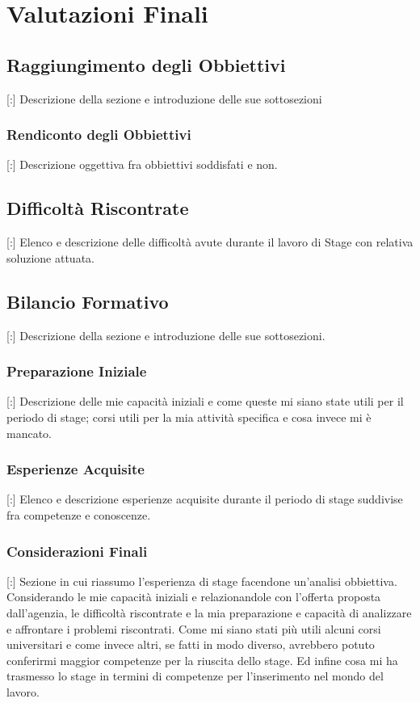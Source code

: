
\chapter{Valutazioni Finali}
\label{4.0}
\thispagestyle{fancy} 

\section{Raggiungimento degli Obbiettivi}

[:] Descrizione della sezione e introduzione delle sue sottosezioni

\subsection{Rendiconto degli Obbiettivi}

[:] Descrizione oggettiva fra obbiettivi soddisfati e non.


\section{Difficoltà Riscontrate}

[:] Elenco e descrizione delle difficoltà avute durante il lavoro di Stage con relativa soluzione attuata.

\section{Bilancio Formativo}

[:] Descrizione della sezione e introduzione delle sue sottosezioni.

\subsection{Preparazione Iniziale}

[:] Descrizione delle mie capacità iniziali e come queste mi siano state utili per il periodo di stage; corsi utili per la mia attività specifica e cosa invece mi è mancato.

\subsection{Esperienze Acquisite}

[:] Elenco e descrizione esperienze acquisite durante il periodo di stage suddivise fra competenze e conoscenze.

\subsection{Considerazioni Finali}

[:] Sezione in cui riassumo l'esperienza di stage facendone un'analisi obbiettiva. Considerando le mie capacità iniziali e relazionandole con l'offerta proposta dall'agenzia, le difficoltà riscontrate e la mia preparazione e capacità di analizzare e affrontare i problemi riscontrati. Come mi siano stati più utili alcuni corsi universitari e come invece altri, se fatti in modo diverso, avrebbero potuto conferirmi maggior competenze per la riuscita dello stage. Ed infine cosa mi ha trasmesso lo stage in termini di competenze per l'inserimento nel mondo del lavoro.
